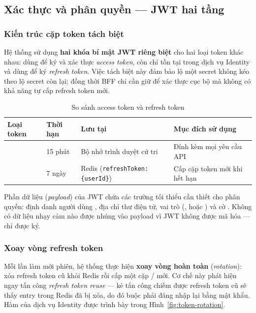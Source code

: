 \subsection{Xác thực và phân quyền — JWT hai tầng}

\subsubsection{Kiến trúc cặp token tách biệt}

Hệ thống sử dụng \textbf{hai khóa bí mật JWT riêng biệt} cho hai loại token khác nhau:  dùng để ký và xác thực \textit{access token}, còn  chỉ tồn tại trong dịch vụ Identity và dùng để ký \textit{refresh token}. Việc tách biệt này đảm bảo lộ một secret không kéo theo lộ secret còn lại; đồng thời BFF chỉ cần giữ  để xác thực cục bộ mà không có khả năng tự cấp refresh token mới.

\begin{table}[H]
\centering
\caption{So sánh access token và refresh token}
\label{tab:so-sanh-jwt}
\begin{tabularx}{\textwidth}{|L{0.2}|L{0.2}|L{0.3}|L{0.3}|}
\hline
\textbf{Loại token} & \textbf{Thời hạn} & \textbf{Lưu tại} & \textbf{Mục đích sử dụng} \\
\hline
{} & 15 phút & Bộ nhớ trình duyệt cử tri & Đính kèm mọi yêu cầu API \\
\hline
{} & 7 ngày & Redis (\texttt{refreshToken:\{userId\}}) & Cấp cặp token mới khi hết hạn \\
\hline
\end{tabularx}
\end{table}

Phần dữ liệu (\textit{payload}) của JWT chứa các trường tối thiểu cần thiết cho phân quyền: định danh người dùng , địa chỉ thư điện tử, vai trò (,  hoặc ) và cờ . Không có dữ liệu nhạy cảm nào được nhúng vào payload vì JWT không được mã hóa — chỉ được ký.

\subsubsection{Xoay vòng refresh token}

Mỗi lần làm mới phiên, hệ thống thực hiện \textbf{xoay vòng hoàn toàn} (\textit{rotation}): xóa refresh token cũ khỏi Redis rồi cấp một cặp / mới. Cơ chế này phát hiện ngay tấn công \textit{refresh token reuse} — kẻ tấn công chiếm được refresh token cũ sẽ thấy entry trong Redis đã bị xóa, do đó buộc phải đăng nhập lại bằng mật khẩu. Hàm  của dịch vụ Identity được trình bày trong Hình~\ref{fig:token-rotation}.

